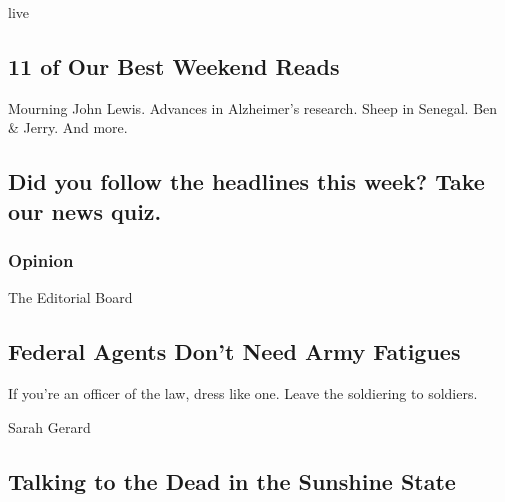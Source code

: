 live

\href{/2020/07/31/briefing/11-of-our-best-weekend-reads.html}{}

\hypertarget{11-of-our-best-weekend-reads}{%
\subsection{11 of Our Best Weekend
Reads}\label{11-of-our-best-weekend-reads}}

Mourning John Lewis. Advances in Alzheimer's research. Sheep in Senegal.
Ben \& Jerry. And more.

\href{/2020/07/31/briefing/11-of-our-best-weekend-reads.html}{}

\href{/interactive/2020/07/31/briefing/troops-baseball-louie-gohmert-news-quiz.html}{}

\hypertarget{did-you-follow-the-headlines-this-week-take-our-news-quiz}{%
\subsection{Did you follow the headlines this week? Take our news
quiz.}\label{did-you-follow-the-headlines-this-week-take-our-news-quiz}}

\href{https://www.nytimes.com/section/opinion?pagetype=Homepage\&action=click\&module=Opinion}{}

\hypertarget{opinion}{%
\subsubsection{Opinion}\label{opinion}}

\href{/2020/07/31/opinion/federal-agents-trump-uniforms.html}{}

The Editorial Board

\hypertarget{federal-agents-dont-need-army-fatigues}{%
\subsection{Federal Agents Don't Need Army
Fatigues}\label{federal-agents-dont-need-army-fatigues}}

If you're an officer of the law, dress like one. Leave the soldiering to
soldiers.

\href{/2020/08/01/opinion/spiritualism-cassadaga-florida.html}{}

Sarah Gerard

\hypertarget{talking-to-the-dead-in-the-sunshine-state}{%
\subsection{Talking to the Dead in the Sunshine
State}\label{talking-to-the-dead-in-the-sunshine-state}}

